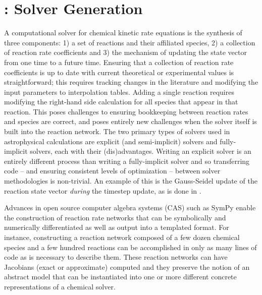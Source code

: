 \section{\dengo{}: Solver Generation}

A computational solver for chemical kinetic rate equations is the synthesis of
three components: 1) a set of reactions and their affiliated species,
2) a collection of reaction rate coefficients and 3) the mechanism of updating
the state vector from one time to a future time.  Ensuring that a collection of
reaction rate coefficients is up to date with current theoretical or
experimental values is straightforward; this requires tracking changes in the
literature and modifying the input parameters to interpolation tables.
Adding a single reaction requires modifying the right-hand side
calculation for all species that appear in that reaction.  This poses
challenges to ensuring bookkeeping between reaction rates and species are
correct, and poses entirely new challenges when the solver itself is built into
the reaction network.  The two primary types of solvers used in astrophysical
calculations are explicit (and semi-implicit) solvers and fully-implicit
solvers, each with their (dis)advantages.  Writing an explicit solver is an
entirely different process than writing a fully-implicit solver and so
transferring code -- and ensuring consistent levels of optimization -- between
solver methodologies is non-trivial.  An example of this is the Gauss-Seidel
update of the reaction state vector \textit{during} the timestep update, as is
done in \grackle{}.

Advances in open source computer algebra systems (CAS) such as SymPy
\citep{10.7717/peerj-cs.103} enable the construction
of reaction rate networks that can be symbolically and numerically
differentiated as well as output into a templated format.  For instance,
constructing a reaction network composed of a few dozen chemical species and a
few hundred reactions can be accomplished in only as many lines of code as is
necessary to describe them.  These reaction networks can have Jacobians (exact
or approximate) computed and they preserve the notion of an abstract model that
can be instantiated into one or more different concrete representations of a
chemical solver.



